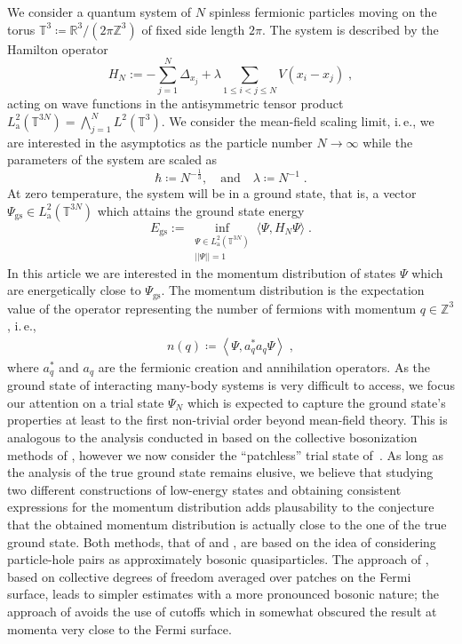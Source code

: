 \documentclass[12pt,a4paper]{article}
\numberwithin{equation}{section}
\newcommand{\Zbb}{\mathbb{Z}}
\newcommand{\1}{\mathbb{I}}
\newcommand{\GS}{\mathrm{gs}}
\newcommand{\Rbb}{\mathbb{R}}
\newcommand{\T}{\mathbb{T}}
\newcommand{\eva}[1]{\left\langle #1 \right\rangle}
\theoremstyle{plain}
\theoremstyle{definition}
\theoremstyle{remark}
\theoremstyle{plain}
\theoremstyle{definition}
\theoremstyle{remark}
\begin{document}
We consider a quantum system of $N$ spinless fermionic particles moving on the torus $\mathbb{T}^3\coloneq \Rbb^3/ (2\pi \Zbb^3)$ of fixed side length $2\pi$. The system is described by the Hamilton operator
\begin{equation}
	H_N := - \sum_{j=1}^{N}\Delta_{x_j} + \lambda \sum_{1\leq i < j \leq N } V(x_i - x_j) \;,
\end{equation}
acting on wave functions in the antisymmetric tensor product $L^2_{\mathrm{a}}(\T^{3N}) = \bigwedge_{j=1}^N L^2(\T^3)$.
We consider the mean-field scaling limit, i.\,e., we are interested in the asymptotics as the particle number $N \to \infty$ while the parameters of the system are scaled as
\begin{equation}
	\hbar\coloneq N^{-\frac{1}{3}}, \quad\text{and}\quad \lambda \coloneq N^{-1} \;.
\end{equation}
At zero temperature, the system will be in a ground state, that is, a vector $ \Psi_{\GS} \in L^2_{\mathrm{a}}(\T^{3N}) $ which attains the ground state energy
\begin{equation} \label{eq:EGS}
	E_{\GS}
	:= \inf_{\substack{\Psi \in L^2_{\mathrm{a}}(\T^{3N}) \\||\Psi|| = 1}} \langle \Psi, H_N \Psi \rangle \;.
\end{equation}
In this article we are interested in the momentum distribution of states $ \Psi $ which are energetically close to $ \Psi_{\GS} $. The momentum distribution is the expectation value of the operator representing the number of fermions with momentum $q \in \Zbb^3$, i.\,e.,
\begin{align}
	n(q) \coloneq \eva{\Psi, a^*_q a_q \Psi} \;,
\end{align}
where $ a_q^*$ and $a_q $ are the fermionic creation and annihilation operators. As the ground state of interacting many-body systems is very difficult to access, we focus our attention on a trial state $ \Psi_N $ which is expected to capture the ground state's properties at least to the first non-trivial order beyond mean-field theory. This is analogous to the analysis conducted in \cite{BL25} based on the collective bosonization methods of \cite{BNPSS20,BNPSS21}, however we now consider the ``patchless'' trial state of~\cite{CHN23}. As long as the analysis of the true ground state remains elusive, we believe that studying two different constructions of low-energy states and obtaining consistent expressions for the momentum distribution adds plausability to the conjecture that the obtained momentum distribution is actually close to the one of the true ground state. Both methods, that of \cite{BL25} and \cite{CHN23}, are based on the idea of considering particle-hole pairs as approximately bosonic quasiparticles. The approach of \cite{BNPSS20,BNPSS21}, based on collective degrees of freedom averaged over patches on the Fermi surface, leads to simpler estimates with a more pronounced bosonic nature; the approach of \cite{CHN23} avoids the use of cutoffs which in \cite{BL25} somewhat obscured the result at momenta very close to the Fermi surface.
\end{document}
